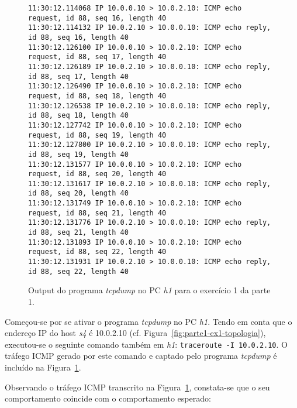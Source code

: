 \begin{figure}[ht]
\begin{Verbatim}[fontsize=\scriptsize]
11:30:12.114068 IP 10.0.0.10 > 10.0.2.10: ICMP echo request, id 88, seq 16, length 40
11:30:12.114132 IP 10.0.2.10 > 10.0.0.10: ICMP echo reply, id 88, seq 16, length 40
11:30:12.126100 IP 10.0.0.10 > 10.0.2.10: ICMP echo request, id 88, seq 17, length 40
11:30:12.126189 IP 10.0.2.10 > 10.0.0.10: ICMP echo reply, id 88, seq 17, length 40
11:30:12.126490 IP 10.0.0.10 > 10.0.2.10: ICMP echo request, id 88, seq 18, length 40
11:30:12.126538 IP 10.0.2.10 > 10.0.0.10: ICMP echo reply, id 88, seq 18, length 40
11:30:12.127742 IP 10.0.0.10 > 10.0.2.10: ICMP echo request, id 88, seq 19, length 40
11:30:12.127800 IP 10.0.2.10 > 10.0.0.10: ICMP echo reply, id 88, seq 19, length 40
11:30:12.131577 IP 10.0.0.10 > 10.0.2.10: ICMP echo request, id 88, seq 20, length 40
11:30:12.131617 IP 10.0.2.10 > 10.0.0.10: ICMP echo reply, id 88, seq 20, length 40
11:30:12.131749 IP 10.0.0.10 > 10.0.2.10: ICMP echo request, id 88, seq 21, length 40
11:30:12.131776 IP 10.0.2.10 > 10.0.0.10: ICMP echo reply, id 88, seq 21, length 40
11:30:12.131893 IP 10.0.0.10 > 10.0.2.10: ICMP echo request, id 88, seq 22, length 40
11:30:12.131931 IP 10.0.2.10 > 10.0.0.10: ICMP echo reply, id 88, seq 22, length 40
\end{Verbatim}
  \caption{Output do programa \emph{tcpdump} no PC \emph{h1} para o exercício 1
  da parte 1.}
  \label{fig:parte1-ex1-tcpdump}
\end{figure}

Começou-se por se ativar o programa \emph{tcpdump} no PC \emph{h1}. Tendo em
conta que o endereço IP do host \emph{s4} é 10.0.2.10 (cf.
Figura~\ref{fig:parte1-ex1-topologia}), executou-se o seguinte comando também em
\emph{h1}: \texttt{traceroute -I 10.0.2.10}. O tráfego ICMP gerado por este
comando e captado pelo programa \emph{tcpdump} é incluído na
Figura~\ref{fig:parte1-ex1-tcpdump}.


Observando o tráfego ICMP transcrito na Figura~\ref{fig:parte1-ex1-tcpdump},
constata-se que o seu comportamento coincide com o comportamento esperado:

